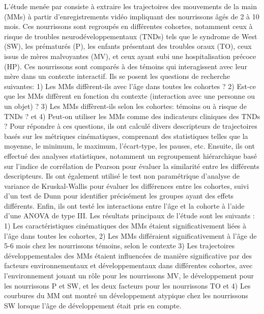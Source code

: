 \documentclass[5pt]{article}
\begin{document}
L'étude menée par \textcite{ouss_developmental_2018} consiste à extraire les trajectoires des mouvements de la main (MMs) à partir d'enregistrements vidéo impliquant des nourrissons âgés de 2 à 10 mois. Ces nourrissons sont regroupés en différentes cohortes, notamment ceux à risque de troubles neurodéveloppementaux (TNDs) tels que le syndrome de West (SW), les prématurés (P), les enfants présentant des troubles oraux (TO), ceux issus de mères malvoyantes (MV), et ceux ayant subi une hospitalisation précoce (HP). Ces nourrissons sont comparés à des témoins qui interagissent avec leur mère dans un contexte interactif. Ils se posent les questions de recherche suivantes: 1) Les MMs diffèrent-ils avec l'âge dans toutes les cohortes ? 2) Est-ce que les MMs diffèrent en fonction du contexte (interaction avec une personne ou un objet) ? 3) Les MMs diffèrent-ils selon les cohortes: témoins ou à risque de TNDs ? et 4) Peut-on utiliser les MMs comme des indicateurs cliniques des TNDs ? Pour répondre à ces questions, ils ont calculé divers descripteurs de trajectoires basés sur les métriques cinématiques, comprenant des statistiques telles que la moyenne, le minimum, le maximum, l'écart-type, les pauses, etc. Ensuite, ils ont effectué des analyses statistiques, notamment un regroupement hiérarchique basé sur l'indice de corrélation de Pearson pour évaluer la similarité entre les différents descripteurs. Ils ont également utilisé le test non paramétrique d'analyse de variance de Kruskal-Wallis pour évaluer les différences entre les cohortes, suivi d'un test de Dunn pour identifier précisément les groupes ayant des effets différents. Enfin, ils ont testé les interactions entre l'âge et la cohorte à l'aide d'une ANOVA de type III. Les résultats principaux de l'étude sont les suivants : 1) Les caractéristiques cinématiques des MMs étaient significativement liées à l'âge dans toutes les cohortes, 2) Les MMs différaient significativement à l'âge de 5-6 mois chez les nourrissons témoins, selon le contexte 3) Les trajectoires développementales des MMs étaient influencées de manière significative par des facteurs environnementaux et développementaux dans différentes cohortes, avec l'environnement jouant un rôle pour les nourrissons MV, le développement pour les nourrissons P et SW, et les deux facteurs pour les nourrissons TO et 4) Les courbures du MM ont montré un développement atypique chez les nourrissons SW lorsque l'âge de développement était pris en compte. 
\end{document}
